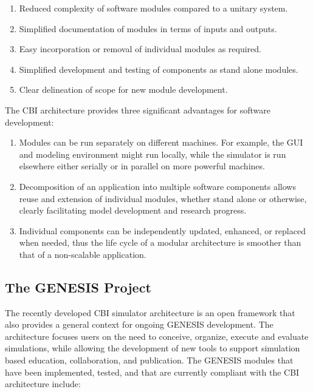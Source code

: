 \documentclass[12pt]{article}
\begin{document}
\begin{enumerate}
\item Reduced complexity of software modules compared to a unitary system.
\item Simplified documentation of modules in terms of inputs and outputs.
\item Easy incorporation or removal of individual modules as required.
\item Simplified development and testing of components as stand alone modules.
\item Clear delineation of scope for new module development.
\end{enumerate}

The CBI architecture provides three significant advantages for software development:

\begin{enumerate}
\item Modules can be run separately on different machines. For example, the GUI and modeling environment might run locally, while the simulator is run elsewhere either serially or in parallel on more powerful machines.
\item Decomposition of an application into multiple software components allows reuse and extension of individual modules, whether stand alone or otherwise, clearly facilitating model development and research progress.
\item Individual components can be independently updated, enhanced, or replaced when needed, thus the life cycle of a modular architecture is smoother than that of a non-scalable application.
\end{enumerate}

\subsection*{The GENESIS Project}

The recently developed CBI simulator architecture is an open framework that also provides a general context for ongoing GENESIS development. The architecture focuses users on the need to conceive, organize, execute and evaluate simulations, while allowing the development of new tools to support simulation based education, collaboration, and publication. The GENESIS modules that have been implemented, tested, and that are currently compliant with the CBI architecture include:
\end{document}
